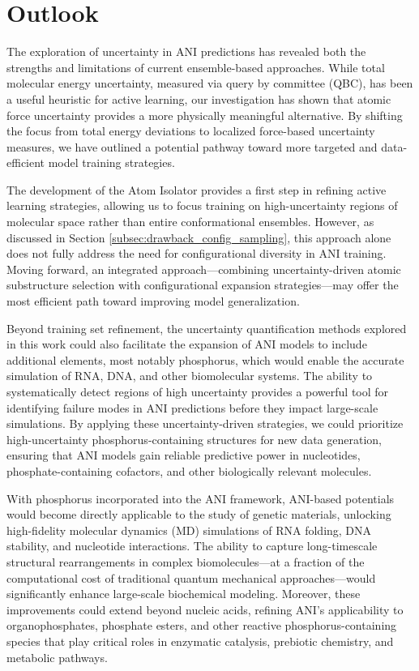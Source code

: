 \section{Outlook}

The exploration of uncertainty in ANI predictions has revealed both the strengths and limitations of current ensemble-based approaches. While total molecular energy uncertainty, measured via query by committee (QBC), has been a useful heuristic for active learning, our investigation has shown that atomic force uncertainty provides a more physically meaningful alternative. By shifting the focus from total energy deviations to localized force-based uncertainty measures, we have outlined a potential pathway toward more targeted and data-efficient model training strategies.

The development of the Atom Isolator provides a first step in refining active learning strategies, allowing us to focus training on high-uncertainty regions of molecular space rather than entire conformational ensembles. However, as discussed in Section \ref{subsec:drawback_config_sampling}, this approach alone does not fully address the need for configurational diversity in ANI training. Moving forward, an integrated approach—combining uncertainty-driven atomic substructure selection with configurational expansion strategies—may offer the most efficient path toward improving model generalization.

Beyond training set refinement, the uncertainty quantification methods explored in this work could also facilitate the expansion of ANI models to include additional elements, most notably phosphorus, which would enable the accurate simulation of RNA, DNA, and other biomolecular systems. The ability to systematically detect regions of high uncertainty provides a powerful tool for identifying failure modes in ANI predictions before they impact large-scale simulations. By applying these uncertainty-driven strategies, we could prioritize high-uncertainty phosphorus-containing structures for new data generation, ensuring that ANI models gain reliable predictive power in nucleotides, phosphate-containing cofactors, and other biologically relevant molecules.

With phosphorus incorporated into the ANI framework, ANI-based potentials would become directly applicable to the study of genetic materials, unlocking high-fidelity molecular dynamics (MD) simulations of RNA folding, DNA stability, and nucleotide interactions. The ability to capture long-timescale structural rearrangements in complex biomolecules—at a fraction of the computational cost of traditional quantum mechanical approaches—would significantly enhance large-scale biochemical modeling. Moreover, these improvements could extend beyond nucleic acids, refining ANI’s applicability to organophosphates, phosphate esters, and other reactive phosphorus-containing species that play critical roles in enzymatic catalysis, prebiotic chemistry, and metabolic pathways.

